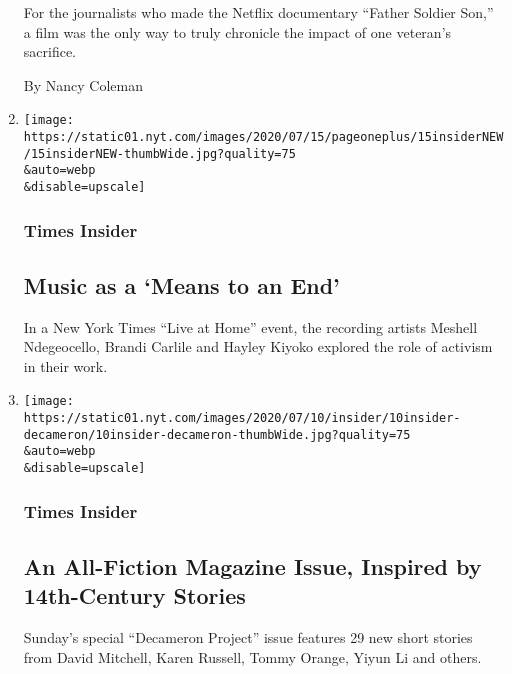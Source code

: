 \begin{enumerate}
  For the journalists who made the Netflix documentary ``Father Soldier
  Son,'' a film was the only way to truly chronicle the impact of one
  veteran's sacrifice.

  By Nancy Coleman
\item
  \href{/2020/07/15/insider/music-queer-activism.html}{}

  \texttt{[image: https://static01.nyt.com/images/2020/07/15/pageoneplus/15insiderNEW/15insiderNEW-thumbWide.jpg?quality=75\\\&auto=webp\\\&disable=upscale]}

  \hypertarget{times-insider-7}{%
  \subsubsection{Times Insider}\label{times-insider-7}}

  \hypertarget{music-as-a-means-to-an-end}{%
  \subsection{Music as a `Means to an
  End'}\label{music-as-a-means-to-an-end}}

  In a New York Times ``Live at Home'' event, the recording artists
  Meshell Ndegeocello, Brandi Carlile and Hayley Kiyoko explored the
  role of activism in their work.
\item
  \href{/2020/07/10/insider/magazine-decameron-fiction-issue.html}{}

  \texttt{[image: https://static01.nyt.com/images/2020/07/10/insider/10insider-decameron/10insider-decameron-thumbWide.jpg?quality=75\\\&auto=webp\\\&disable=upscale]}

  \hypertarget{times-insider-8}{%
  \subsubsection{Times Insider}\label{times-insider-8}}

  \hypertarget{an-all-fiction-magazine-issue-inspired-by-14th-century-stories}{%
  \subsection{An All-Fiction Magazine Issue, Inspired by 14th-Century
  Stories}\label{an-all-fiction-magazine-issue-inspired-by-14th-century-stories}}

  Sunday's special ``Decameron Project'' issue features 29 new short
  stories from David Mitchell, Karen Russell, Tommy Orange, Yiyun Li and
  others.


\end{enumerate}
